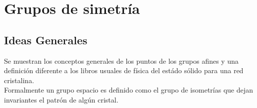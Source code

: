 \chapter{Grupos de simetría}\label{aped.A}

\section{Ideas Generales}
\label{A.1.}

Se muestran los conceptos generales de los puntos de los grupos afines y una definición diferente a los libros usuales de física del estádo sólido para una red cristalina.\\
Formalmente un grupo espacio es definido como el grupo de isometrías que dejan invariantes el patrón de algún cristal.


